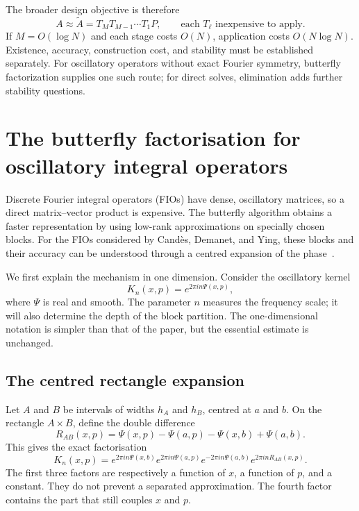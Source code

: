 \documentclass[11pt,a4paper]{article}
\numberwithin{equation}{section}
\begin{document}
The broader design objective is therefore
\begin{equation}
 A\approx \widetilde A=T_MT_{M-1}\cdots T_1P,
 \qquad\text{each }T_\ell\text{ inexpensive to apply}.
 \label{eq:factor-design}
\end{equation}
If $M=O(\log N)$ and each stage costs $O(N)$, application costs $O(N\log N)$. Existence, accuracy, construction cost, and stability must be established separately. For oscillatory operators without exact Fourier symmetry, butterfly factorization supplies one such route; for direct solves, elimination adds further stability questions.

\setcounter{section}{3}
\section{The butterfly factorisation for oscillatory integral operators}
\label{sec:butterfly}

Discrete Fourier integral operators (FIOs) have dense, oscillatory matrices, so a direct matrix--vector product is expensive. The butterfly algorithm obtains a faster representation by using low-rank approximations on specially chosen blocks. For the FIOs considered by Cand\`{e}s, Demanet, and Ying, these blocks and their accuracy can be understood through a centred expansion of the phase~\cite{candes2009butterfly}.

We first explain the mechanism in one dimension. Consider the oscillatory kernel
\begin{equation}
    K_n(x,p)=e^{2\pi i n\Psi(x,p)},
    \label{eq:scaled-kernel}
\end{equation}
where $\Psi$ is real and smooth. The parameter $n$ measures the frequency scale; it will also determine the depth of the block partition. The one-dimensional notation is simpler than that of the paper, but the essential estimate is unchanged.

\subsection{The centred rectangle expansion}

Let $A$ and $B$ be intervals of widths $h_A$ and $h_B$, centred at $a$ and $b$. On the rectangle $A\times B$, define the double difference
\begin{equation}
    R_{AB}(x,p)
    =\Psi(x,p)-\Psi(a,p)-\Psi(x,b)+\Psi(a,b).
    \label{eq:rectangle-remainder}
\end{equation}
This gives the exact factorisation
\begin{equation}
    K_n(x,p)
    =e^{2\pi i n\Psi(x,b)}
     e^{2\pi i n\Psi(a,p)}
     e^{-2\pi i n\Psi(a,b)}
     e^{2\pi i nR_{AB}(x,p)}.
    \label{eq:centered-factorisation}
\end{equation}
The first three factors are respectively a function of $x$, a function of $p$, and a constant. They do not prevent a separated approximation. The fourth factor contains the part that still couples $x$ and $p$.
\end{document}
